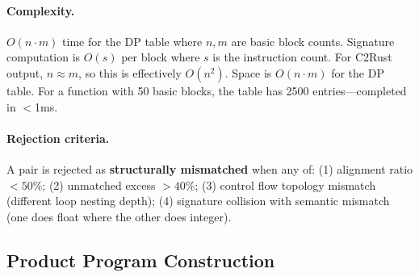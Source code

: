 \documentclass[11pt]{article}
\begin{document}
\paragraph{Complexity.} $O(n \cdot m)$ time for the DP table where $n, m$ are basic block counts. Signature computation is $O(s)$ per block where $s$ is the instruction count. For C2Rust output, $n \approx m$, so this is effectively $O(n^2)$. Space is $O(n \cdot m)$ for the DP table. For a function with 50 basic blocks, the table has 2500 entries---completed in $<$1ms.

\paragraph{Rejection criteria.} A pair is rejected as \textbf{structurally mismatched} when any of:
(1) alignment ratio $< 50\%$;
(2) unmatched excess $> 40\%$;
(3) control flow topology mismatch (different loop nesting depth);
(4) signature collision with semantic mismatch (one does float where the other does integer).


\subsection{Product Program Construction}
\label{sec:alg-product}
\end{document}
